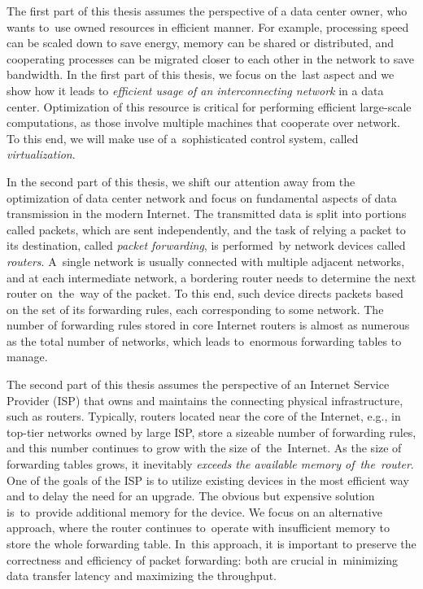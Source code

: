 \medskip
The first part of this thesis assumes the perspective of a data center owner, who wants to~use owned resources in efficient manner.
For example, processing speed can be scaled down to save energy, memory can be shared or distributed, and cooperating processes can be migrated closer to each other in the network to save bandwidth.
In the first part of this thesis, we focus on the~last aspect and we show how it leads to
\emph{efficient usage of an interconnecting network} in a data center.
Optimization of this resource is critical for performing efficient large-scale computations, as those involve multiple machines that cooperate over network.
To this end, we will make use of a~sophisticated control system, called \emph{virtualization}.

\medskip

In the second part of this thesis, we shift our attention away from the optimization of data center network and focus on fundamental aspects of data transmission in the modern Internet.
The transmitted data is split into portions called packets, which are sent independently, and the task of relying a packet to its destination, called \emph{packet forwarding}, is performed~by network devices called \emph{routers}.
A~single network is usually connected with multiple adjacent networks, and at each intermediate network, a bordering router needs to determine the next router on~the~way of the packet.
To this end, such device directs packets based on the set of its forwarding rules, each corresponding to some network.
The number of forwarding rules stored in core Internet routers is almost as numerous as the total number of networks, which leads to~enormous forwarding tables to manage.

The second part of this thesis assumes the perspective of an Internet Service Provider (ISP) that owns and maintains the connecting physical infrastructure, such as routers.
Typically, routers located near the core of the Internet, e.g., in top-tier networks owned by large ISP, store a sizeable number of forwarding rules, and this number continues to grow with the size of~the~Internet.
As the size of forwarding tables grows, it inevitably \emph{exceeds the available memory of~the~router}.
One of the goals of the ISP is to utilize existing devices in the most efficient way and to delay the need for an upgrade.
The obvious but expensive solution is~to~provide additional memory for the device.
We focus on an alternative approach, where the router continues to~operate with insufficient memory to store the whole forwarding table.
In~this approach, it is important to preserve the correctness and efficiency of packet forwarding: both are crucial in~minimizing data transfer latency and maximizing the throughput.


